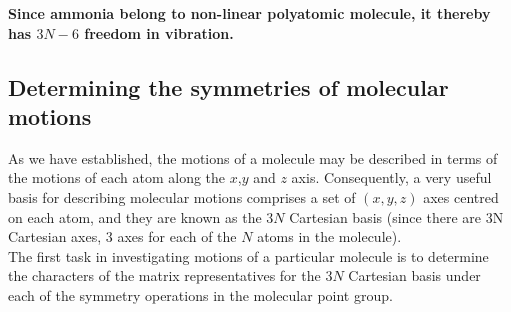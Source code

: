 \documentclass[a4paper, 12pt, openany]{report}
\begin{document}
\textbf{Since ammonia belong to non-linear polyatomic molecule, it thereby has $3N-6$ freedom in vibration.}
\subsection{Determining the symmetries of molecular \break motions}
As we have established, the motions of a molecule may be described in terms of the motions of each atom along the $x$,$y$ and $z$ axis. Consequently, a very useful basis for describing molecular motions comprises a set of $(x, y, z)$ axes centred on each atom, and they are known as the $3N$ Cartesian basis (since there are 3N Cartesian axes, $3$ axes for each of the $N$ atoms in the molecule). \\
 The first task in investigating motions of a particular molecule is to determine the characters of the matrix representatives for the $3N$ Cartesian basis under each of the symmetry operations in the molecular point group.
 
\end{document}
